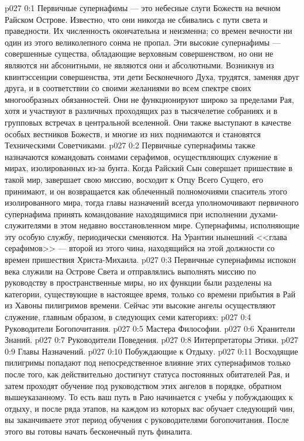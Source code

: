 \vs p027 0:1 Первичные супернафимы --- это небесные слуги Божеств на вечном Райском Острове. Известно, что они никогда не сбивались с пути света и праведности. Их численность окончательна и неизменна; со времен вечности ни один из этого великолепного сонма не пропал. Эти высокие супернафимы --- совершенные существа, обладающие верховным совершенством, но они не являются ни абсонитными, не являются они и абсолютными. Возникнув из квинтэссенции совершенства, эти дети Бесконечного Духа, трудятся, заменяя друг друга, и в соответствии со своими желаниями во всем спектре своих многообразных обязанностей. Они не функционируют широко за пределами Рая, хотя и участвуют в различных проходящих раз в тысячелетие собраниях и в групповых встречах в центральной вселенной. Они также выступают в качестве особых вестников Божеств, и многие из них поднимаются и становятся Техническими Советчиками.
\vs p027 0:2 Первичные супернафимы также назначаются командовать сонмами серафимов, осуществляющих служение в мирах, изолированных из\hyp{}за бунта. Когда Райский Сын совершает пришествие в такой мир, завершает свою миссию, восходит к Отцу Всего Сущего, его принимают, и он возвращается как облеченный полномочиями спаситель этого изолированного мира, тогда главы назначений всегда уполномочивают первичного супернафима принять командование находящимися при исполнении духами\hyp{}служителями в этом недавно восстановленном мире. Супернафимы, исполняющие эту особую службу, периодически сменяются. На Урантии нынешний <<глава серафимов>> --- второй из этого чина, находящийся на этой должности со времен пришествия Христа\hyp{}Михаила.
\vs p027 0:3 Первичные супернафимы испокон века служили на Острове Света и отправлялись выполнять миссию по руководству в пространственные миры, но их функции были разделены на категории, существующие в настоящее время, только со времени прибытия в Рай из Хавоны пилигримов времени. Сейчас эти высокие ангелы осуществляют служение, главным образом, в следующих семи категориях:
\vs p027 0:4 \bibnobreakspace Руководители Богопочитания.
\vs p027 0:5 \bibnobreakspace Мастера Философии.
\vs p027 0:6 \bibnobreakspace Хранители Знаний.
\vs p027 0:7 \bibnobreakspace Руководители Поведения.
\vs p027 0:8 \bibnobreakspace Интерпретаторы Этики.
\vs p027 0:9 \bibnobreakspace Главы Назначений.
\vs p027 0:10 \bibnobreakspace Побуждающие к Отдыху.
\vs p027 0:11 Восходящие пилигримы попадают под непосредственное влияние этих супернафимов только после того, как действительно достигнут статуса постоянных обитателей Рая, и затем проходят обучение под руководством этих ангелов в порядке, обратном вышеуказанному. То есть ваш путь в Раю начинается с учебы у побуждающих к отдыху, и после ряда этапов, на каждом из которых вас обучает следующий чин, вы заканчиваете этот период обучения с руководителями богопочитания. После этого вы готовы начать бесконечный путь финалита.
